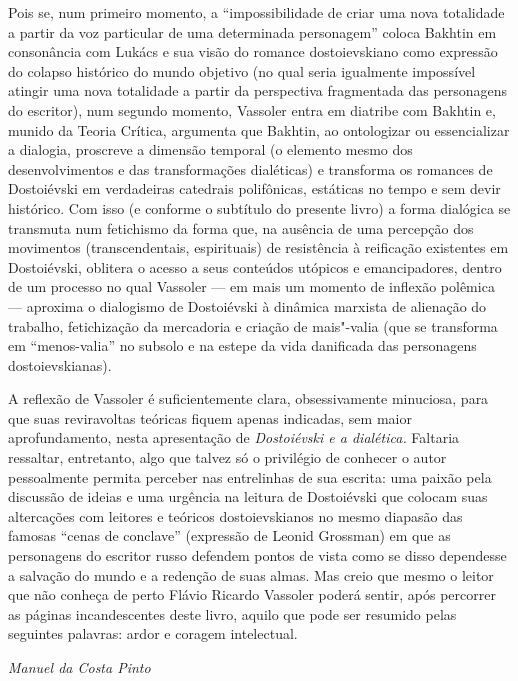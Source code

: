 Pois se, num primeiro momento, a ``impossibilidade de criar uma nova
totalidade a partir da voz particular de uma determinada personagem''
coloca Bakhtin em consonância com Lukács e sua visão do romance
dostoievskiano como expressão do colapso histórico do mundo objetivo (no
qual seria igualmente impossível atingir uma nova totalidade a partir da
perspectiva fragmentada das personagens do escritor), num segundo
momento, Vassoler entra em diatribe com Bakhtin e, munido da Teoria
Crítica, argumenta que Bakhtin, ao ontologizar ou essencializar a
dialogia, proscreve a dimensão temporal (o elemento mesmo dos
desenvolvimentos e das transformações dialéticas) e transforma os
romances de Dostoiévski em verdadeiras catedrais polifônicas, estáticas
no tempo e sem devir histórico. Com isso (e conforme o subtítulo do
presente livro) a forma dialógica se transmuta num fetichismo da forma
que, na ausência de uma percepção dos movimentos (transcendentais,
espirituais) de resistência à reificação existentes em Dostoiévski,
oblitera o acesso a seus conteúdos utópicos e emancipadores, dentro de
um processo no qual Vassoler --- em mais um momento de inflexão polêmica
--- aproxima o dialogismo de Dostoiévski à dinâmica marxista de alienação
do trabalho, fetichização da mercadoria e criação de mais"-valia (que se
transforma em ``menos-valia'' no subsolo e na estepe da vida danificada
das personagens dostoievskianas).

A reflexão de Vassoler é suficientemente clara, obsessivamente
minuciosa, para que suas reviravoltas teóricas fiquem apenas indicadas,
sem maior aprofundamento, nesta apresentação de \emph{Dostoiévski e a
dialética.} Faltaria ressaltar, entretanto, algo que talvez só o
privilégio de conhecer o autor pessoalmente permita perceber nas
entrelinhas de sua escrita: uma paixão pela discussão de ideias e uma
urgência na leitura de Dostoiévski que colocam suas altercações com
leitores e teóricos dostoievskianos no mesmo diapasão das famosas
``cenas de conclave'' (expressão de Leonid Grossman) em que as
personagens do escritor russo defendem pontos de vista como se disso
dependesse a salvação do mundo e a redenção de suas almas. Mas creio que
mesmo o leitor que não conheça de perto Flávio Ricardo Vassoler poderá
sentir, após percorrer as páginas incandescentes deste livro, aquilo que
pode ser resumido pelas seguintes palavras: ardor e coragem intelectual.

\begin{flushright}
\emph{Manuel da Costa Pinto}
\end{flushright}
